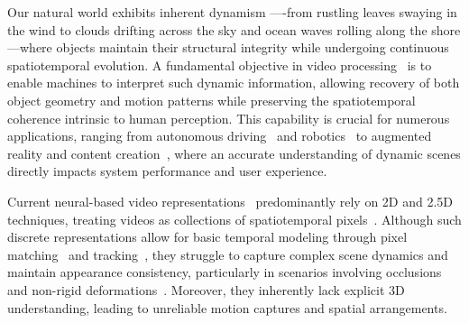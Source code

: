 Our natural world exhibits inherent dynamism ----from rustling leaves swaying in the wind to clouds drifting across the sky and ocean waves rolling along the shore---where objects maintain their structural integrity while undergoing continuous spatiotemporal evolution. A fundamental objective in video processing~\cite{tekalp2015digital,bovik2009essential} is to enable machines to interpret such dynamic information, allowing recovery of both object geometry and motion patterns while preserving the spatiotemporal coherence intrinsic to human perception.
This capability is crucial for numerous applications, ranging from autonomous driving~\cite{gao2024vista,li2024vdg} and robotics~\cite{huang2023voxposer,huang2024rekep,o2023open} to augmented reality and content creation~\cite{sun2024sora,kondratyuk2023videopoet,bao2024vidu,yi2024diffusion}, where an accurate understanding of dynamic scenes directly impacts system performance and user experience.




Current neural-based video representations~\cite{ouyang2024codef, sitzmann2020implicit, ye2022deformable} predominantly rely on 2D and 2.5D techniques, treating videos as collections of spatiotemporal pixels~\cite{feichtenhofer2019slowfast, zhang2019comprehensive}. Although such discrete representations allow for basic temporal modeling through pixel matching~\cite{sun2018pwc} and tracking~\cite{karaev2023cotracker, ye2022ostrack}, they struggle to capture complex scene dynamics and maintain appearance consistency, particularly in scenarios involving occlusions and non-rigid deformations~\cite{newcombe2015dynamicfusion, ouyang2024codef}. Moreover, they inherently lack explicit 3D understanding, leading to unreliable motion captures and spatial arrangements.



